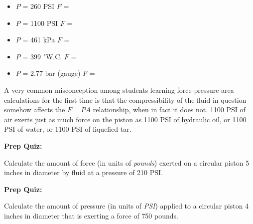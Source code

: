 \vskip 10pt

\begin{itemize}
\item{} $P$ = 260 PSI \hskip 30pt $F$ = 
\vskip 5pt
\item{} $P$ = 1100 PSI \hskip 30pt $F$ = 
\vskip 5pt
\item{} $P$ = 461 kPa \hskip 30pt $F$ = 
\vskip 5pt
\item{} $P$ = 399 "W.C. \hskip 30pt $F$ = 
\vskip 5pt
\item{} $P$ = 2.77 bar (gauge) \hskip 30pt $F$ = 
\end{itemize}

A very common misconception among students learning force-pressure-area calculations for the first time is that the compressibility of the fluid in question somehow affects the $F = PA$ relationship, when in fact it does not.  1100 PSI of air exerts just as much force on the piston as 1100 PSI of hydraulic oil, or 1100 PSI of water, or 1100 PSI of liquefied tar.








\vfil \eject

\noindent
{\bf Prep Quiz:}

Calculate the amount of force (in units of {\it pounds}) exerted on a circular piston 5 inches in diameter by fluid at a pressure of 210 PSI.










\vfil \eject

\noindent
{\bf Prep Quiz:}

Calculate the amount of pressure (in units of {\it PSI}) applied to a circular piston 4 inches in diameter that is exerting a force of 750 pounds.





